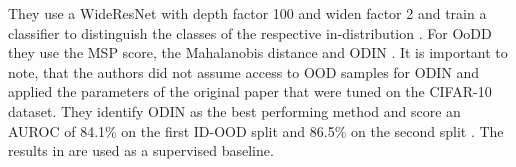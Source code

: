 They use a WideResNet \citep{Zagoruyko2016} with depth factor 100 and widen factor 2 and train a classifier to distinguish the classes of the respective in-distribution \citep{Berger2021}.
For OoDD they use the MSP score, the Mahalanobis distance and ODIN \citep{Berger2021}.
It is important to note, that the authors did not assume access to OOD samples for ODIN and applied the parameters of the original paper \citep{Liang2018} that were tuned on the CIFAR-10 \citep{Krizhevsky2009b} dataset.
They identify ODIN as the best performing method and score an AUROC of 84.1\% on the first ID-OOD split and 86.5\% on the second split \citep{Berger2021}.
The results in \citep{Berger2021} are used as a supervised baseline.
\par
\label{section: SSL}
